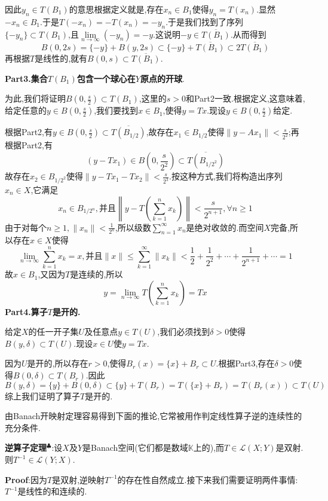 因此$y_n\in T(B_1)$的意思根据定义就是,存在$x_n\in B_1$使得$y_n=T(x_n)$.显然$-x_n\in B_1$.于是$T(-x_n)=-T(x_n)=-y_n$.于是我们找到了序列$\{-y_n\}\subset T(B_1)$,且$\lim\limits_{n\to\infty}(-y_n)=-y$.这说明$-y\in\overline{T(B_1)}$.从而得到
$$
B(0,2s)=\{-y\}+B(y,2s)\subset \{-y\}+\overline{T(B_1)}\subset 2\overline{T(B_1)}
$$
再根据$T$是线性的,就有$B(0,s)\subset \overline{T(B_1)}$.\par
\textbf{Part3.集合$T(B_1)$包含一个球心在$Y$原点的开球}.\par
为此,我们将证明$B\left(0,\frac{s}{2}\right)\subset T(B_1)$,这里的$s>0$和Part2一致.根据定义,这意味着,给定任意的$y\in B\left(0,\frac{s}{2}\right)$,我们要找到$x\in B_1$,使得$y=Tx$.现设$y\in B\left(0,\frac{s}{2}\right)$给定.\par
根据Part2,有$y\in B\left(0,\frac{s}{2}\right)\subset\overline{T(B_{1/2})}$,故存在$x_1\in B_{1/2}$使得$\|y-Ax_1\|<\frac{s}{2^2}$;再根据Part2,有
$$
(y-Tx_1)\in B\left(0,\frac{s}{2^2}\right)\subset \overline{T(B_{1/2^2})}
$$
故存在$x_2\in B_{1/2^2}$使得$\|y-Tx_1-Tx_2\|<\frac{s}{2^3}$.按这种方式,我们将构造出序列$x_n\in X$,它满足
$$
x_n\in B_{1/2^n},\text{并且}\left\|y-T\left(\sum_{k=1}^nx_k\right)\right\|<\frac{s}{2^{n+1}},\forall n\geqslant 1
$$
由于对每个$n\geqslant 1,\|x_n\|<\frac{1}{2^n}$,所以级数$\sum_{n=1}^{\infty}x_n$是绝对收敛的.而空间$X$完备,所以存在$x\in X$使得
$$
\lim\limits_{n\to\infty}\sum_{k=1}^nx_k=x,\text{并且}\|x\|\leqslant \sum_{k=1}^{\infty}\|x_k\|<\frac{1}{2}+\frac{1}{2^2}+\cdots+\frac{1}{2^{n+1}}+\cdots=1
$$
故$x\in B_1$,又因为$T$是连续的,所以
$$
y=\lim\limits_{n\to\infty}T\left(\sum_{k=1}^nx_k\right)=Tx
$$
\qquad \textbf{Part4.算子$T$是开的.}\par
给定$X$的任一开子集$U$及任意点$y\in T(U)$,我们必须找到$\delta>0$使得$B(y,\delta)\subset T(U)$.现设$x\in U$使$y=Tx$.\par
因为$U$是开的,所以存在$r>0$,使得$B_r(x)=\{x\}+B_r\subset U$.根据Part3,存在$\delta>0$使得$B(0,\delta)\subset T(B_r)$.因此
$$
B(y,\delta)=\{y\}+B(0,\delta)\subset \{y\}+T(B_r)=T(\{x\}+B_r)=T(B_r(x))\subset T(U)
$$
综上我们证明了算子$T$是开的.\par
由Banach开映射定理容易得到下面的推论,它常被用作判定线性算子逆的连续性的充分条件.\par
\textbf{逆算子定理}$^\clubsuit $:设$X$及$Y$是Banach空间(它们都是数域$\mathbb{K}$上的),而$T\in\mathcal{L}(X;Y)$是双射.则$T^{-1}\in\mathcal{L}(Y;X)$.\par
\textbf{Proof}:因为$T$是双射,逆映射$T^{-1}$的存在性自然成立.接下来我们需要证明两件事情:$T^{-1}$是线性的和连续的.\par
